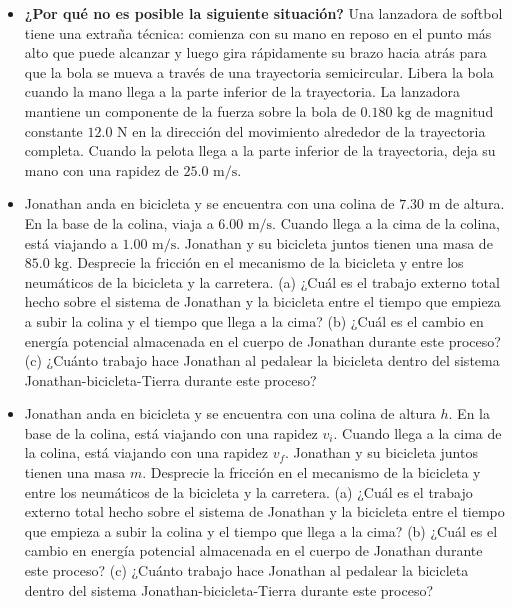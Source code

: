 \documentclass[11pt,a4paper]{article}
\begin{document}
\begin{itemize}
    \item[\textbf{28.}] \textbf{¿Por qué no es posible la siguiente situación?} Una lanzadora de softbol tiene una extraña técnica: comienza con su mano en reposo en el punto más alto que puede alcanzar y luego gira rápidamente su brazo hacia atrás para que la bola se mueva a través de una trayectoria semicircular. Libera la bola cuando la mano llega a la parte inferior de la trayectoria. La lanzadora mantiene un componente de la fuerza sobre la bola de $0.180 \text{ kg}$ de magnitud constante $12.0 \text{ N}$ en la dirección del movimiento alrededor de la trayectoria completa. Cuando la pelota llega a la parte inferior de la trayectoria, deja su mano con una rapidez de $25.0 \text{ m/s}$.
    \vspace*{6cm}

    \item[\textbf{29.}] Jonathan anda en bicicleta y se encuentra con una colina de $7.30 \text{ m}$ de altura. En la base de la colina, viaja a $6.00 \text{ m/s}$. Cuando llega a la cima de la colina, está viajando a $1.00 \text{ m/s}$. Jonathan y su bicicleta juntos tienen una masa de $85.0 \text{ kg}$. Desprecie la fricción en el mecanismo de la bicicleta y entre los neumáticos de la bicicleta y la carretera. (a) ¿Cuál es el trabajo externo total hecho sobre el sistema de Jonathan y la bicicleta entre el tiempo que empieza a subir la colina y el tiempo que llega a la cima? (b) ¿Cuál es el cambio en energía potencial almacenada en el cuerpo de Jonathan durante este proceso? (c) ¿Cuánto trabajo hace Jonathan al pedalear la bicicleta dentro del sistema Jonathan-bicicleta-Tierra durante este proceso?
    \vspace*{6cm}

    \item[\textbf{30.}] Jonathan anda en bicicleta y se encuentra con una colina de altura $h$. En la base de la colina, está viajando con una rapidez $v_i$. Cuando llega a la cima de la colina, está viajando con una rapidez $v_f$. Jonathan y su bicicleta juntos tienen una masa $m$. Desprecie la fricción en el mecanismo de la bicicleta y entre los neumáticos de la bicicleta y la carretera. (a) ¿Cuál es el trabajo externo total hecho sobre el sistema de Jonathan y la bicicleta entre el tiempo que empieza a subir la colina y el tiempo que llega a la cima? (b) ¿Cuál es el cambio en energía potencial almacenada en el cuerpo de Jonathan durante este proceso? (c) ¿Cuánto trabajo hace Jonathan al pedalear la bicicleta dentro del sistema Jonathan-bicicleta-Tierra durante este proceso?
    \vspace*{6cm}


\end{itemize}
\end{document}
